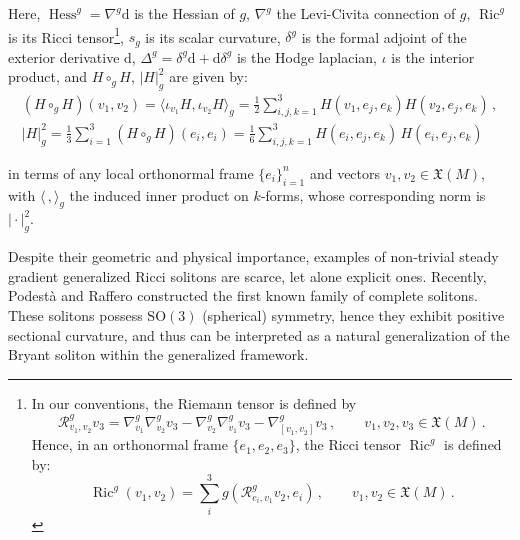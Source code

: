 \documentclass[12pt,a4paper,reqno]{amsart}
\theoremstyle{plain}
\theoremstyle{remark}
\numberwithin{equation}{section}
\newcommand{\cR}{\mathcal{R}}
\newcommand{\dd}{\mathrm{d}}
\newcommand{\SO}{\mathrm{SO}}
\DeclareMathOperator{\Ric}{\mathrm{Ric}}
\DeclareMathOperator{\Hess}{\mathrm{Hess}}
\begin{document}
Here, $\Hess^g=\nabla^g\dd$ is the Hessian of $g$, $\nabla^g$ the Levi-Civita connection of $g$, $\Ric^g$ is its Ricci tensor\footnote{In our conventions, the Riemann tensor is defined by
\begin{equation*}
\cR^g_{v_1,v_2} v_3 = \nabla^g_{v_1} \nabla^g_{v_2} v_3 - \nabla^g_{v_2} \nabla^g_{v_1} v_3 - \nabla^g_{[v_1,v_2]} v_3 \,, \qquad v_1, v_2, v_3\in \mathfrak{X}(M) \,.
\end{equation*}
Hence, in an orthonormal frame $\{e_1,e_2,e_3\}$, the Ricci tensor $\Ric^g$ is defined by:
\begin{equation*}
\Ric^g(v_1,v_2) = \sum_i^3 g(\cR^g_{e_i,v_1}v_2,e_i) \,, \qquad v_1,v_2 \in \mathfrak{X}(M) \,.
\end{equation*}}, $s_g$ is its scalar curvature, $\delta^g$ is the formal adjoint of the exterior derivative $\dd$, $\Delta^g=\delta^g\dd + \dd\delta^g$ is the Hodge laplacian, $\iota$ is the interior product, and $H \circ_g H$, $|H|_g^2$ are given by:
\begin{gather*}
(H\circ_g H)(v_1,v_2) = \langle\iota_{v_1}H,\iota_{v_2}H\rangle_g = \frac{1}{2}\sum_{i,j,k=1}^3 H(v_1,e_j,e_k) H(v_2,e_j, e_k) \,, \\
\vert H \vert_g^2 = \frac{1}{3}\sum_{i=1}^3 (H\circ_g H)(e_i,e_i) = \frac{1}{6}\sum_{i,j,k=1}^3 H(e_i,e_j,e_k) \, H(e_i,e_j,e_k)    
\end{gather*}

in terms of any local orthonormal frame $\{e_i\}_{i=1}^n$ and vectors $v_1,v_2 \in \mathfrak{X}(M)$, with $\langle\,,\rangle_g$ the induced inner product on $k$-forms, whose corresponding norm is $\vert\cdot\vert_g^2$.

Despite their geometric and physical importance, examples of non‑trivial steady gradient generalized Ricci solitons are scarce, let alone explicit ones. Recently, Podestà and Raffero \cite{PodestaRaffero2025} constructed the first known family of complete solitons. These solitons possess $\SO(3)$ (spherical) symmetry, hence they exhibit positive sectional curvature, and thus can be interpreted as a natural generalization of the Bryant soliton \cite{Bryant2005} within the generalized framework.
\end{document}
